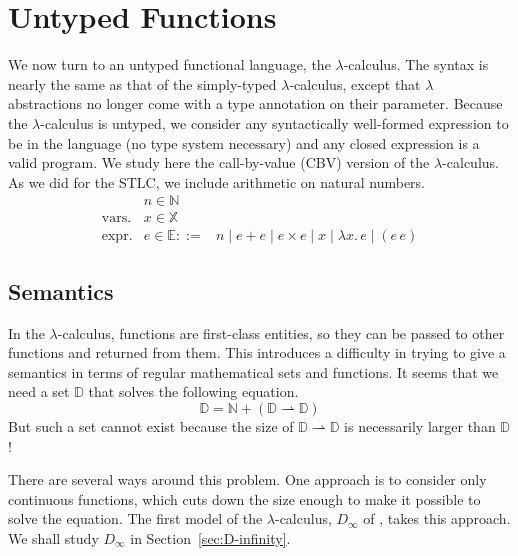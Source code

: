 \documentclass{tufte-handout}
\newcommand{\LAM}[1]{\lambda #1.\,}
\newcommand{\pto}[0]{\rightharpoonup}
\newcommand{\VAR}[0]{\mathbb{X}}
\begin{document}
\section{Untyped Functions}
\label{sec:lambda}


We now turn to an untyped functional language, the $\lambda$-calculus.
The syntax is nearly the same as that of the simply-typed
$\lambda$-calculus, except that $\lambda$ abstractions no longer come
with a type annotation on their parameter.  Because the
$\lambda$-calculus is untyped, we consider any syntactically
well-formed expression to be in the language (no type system
necessary) and any closed expression is a valid program.  We study
here the call-by-value (CBV) version of the $\lambda$-calculus.  As we
did for the STLC, we include arithmetic on natural numbers.
\[
\begin{array}{lrl}
              & n \in \mathbb{N} \\
 \text{vars.} & x \in \VAR\\
 \text{expr.}& e \in\mathbb{E} ::=& n \mid e + e \mid e \times e \mid x \mid \LAM{x} e \mid (e \, e)
\end{array}
\]

\subsection{Semantics}

In the $\lambda$-calculus, functions are first-class entities, so they
can be passed to other functions and returned from them. This
introduces a difficulty in trying to give a semantics in terms of
regular mathematical sets and functions. It seems that we need a set
$\mathbb{D}$ that solves the following equation.
\[
   \mathbb{D} = \mathbb{N} + (\mathbb{D} \pto \mathbb{D})
\]
But such a set cannot exist because the size of $\mathbb{D} \pto
\mathbb{D}$ is necessarily larger than $\mathbb{D}$!

There are several ways around this problem. One approach is to
consider only continuous functions, which cuts down the size enough to
make it possible to solve the equation. The first model of the
$\lambda$-calculus, $D_\infty$ of \citet{Scott:1970dp}, takes this
approach. We shall study $D_\infty$ in Section~\ref{sec:D-infinity}.
\end{document}
